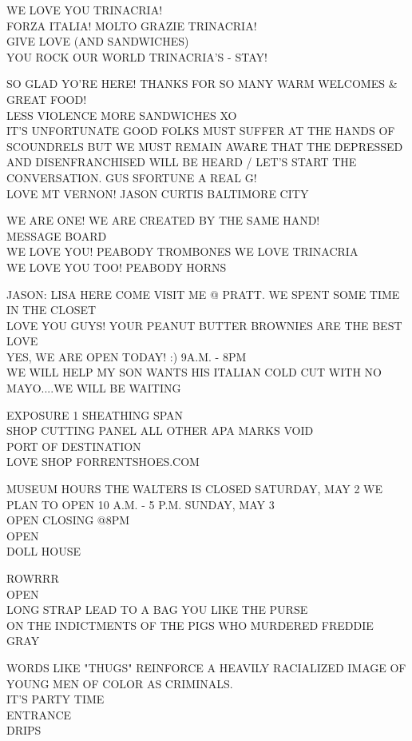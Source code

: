 \documentclass[10pt,letterpaper]{article}
\begin{document}
WE LOVE YOU TRINACRIA!\\
FORZA ITALIA!  MOLTO GRAZIE TRINACRIA!\\
GIVE LOVE (AND SANDWICHES)\\
YOU ROCK OUR WORLD TRINACRIA'S {-} STAY!

SO GLAD YO'RE HERE!  THANKS FOR SO MANY WARM WELCOMES \& GREAT FOOD!\\
LESS VIOLENCE MORE SANDWICHES XO\\
IT'S UNFORTUNATE GOOD FOLKS MUST SUFFER AT THE HANDS OF SCOUNDRELS BUT WE MUST REMAIN AWARE THAT THE DEPRESSED AND DISENFRANCHISED WILL BE HEARD / LET'S START THE CONVERSATION.  GUS SFORTUNE A REAL G!\\
LOVE MT VERNON!  JASON CURTIS BALTIMORE CITY

WE ARE ONE!  WE ARE CREATED BY THE SAME HAND!\\
MESSAGE BOARD\\
WE LOVE YOU!  PEABODY TROMBONES WE LOVE TRINACRIA\\
WE LOVE YOU TOO!  PEABODY HORNS

JASON: LISA HERE COME VISIT ME @ PRATT.  WE SPENT SOME TIME IN THE CLOSET\\
LOVE YOU GUYS!  YOUR PEANUT BUTTER BROWNIES ARE THE BEST LOVE\\
YES, WE ARE OPEN TODAY! :)  9A.M. {-} 8PM\\
WE WILL HELP MY SON WANTS HIS ITALIAN COLD CUT WITH NO MAYO....WE WILL BE WAITING

EXPOSURE 1 SHEATHING SPAN\\
SHOP CUTTING PANEL ALL OTHER APA MARKS VOID\\
PORT OF DESTINATION\\
LOVE SHOP FORRENTSHOES.COM

MUSEUM HOURS THE WALTERS IS CLOSED SATURDAY, MAY 2 WE PLAN TO OPEN 10 A.M. {-} 5 P.M. SUNDAY, MAY 3\\
OPEN CLOSING @8PM\\
OPEN\\
DOLL HOUSE

ROWRRR\\
OPEN\\
LONG STRAP LEAD TO A BAG YOU LIKE THE PURSE\\
ON THE INDICTMENTS OF THE PIGS WHO MURDERED FREDDIE GRAY

WORDS LIKE "THUGS" REINFORCE A HEAVILY RACIALIZED IMAGE OF YOUNG MEN OF COLOR AS CRIMINALS.\\
IT'S PARTY TIME\\
ENTRANCE\\
DRIPS
\end{document}
